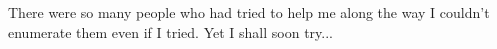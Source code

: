 There were so many people who had tried to help me along the way I couldn't
enumerate them even if I tried. Yet I shall soon try...
